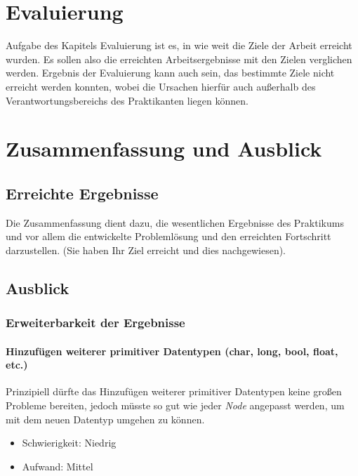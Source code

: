 \documentclass[oneside]{ausarbeitung}
\begin{document}
\chapter{Evaluierung}

Aufgabe des Kapitels Evaluierung ist es, in wie weit die Ziele der 
Arbeit erreicht wurden. Es sollen also die erreichten Arbeitsergebnisse 
mit den Zielen verglichen werden. Ergebnis der Evaluierung kann auch 
sein, das bestimmte Ziele nicht erreicht werden konnten, wobei die 
Ursachen hierfür auch außerhalb des Verantwortungsbereichs des 
Praktikanten liegen können.

\chapter{Zusammenfassung und Ausblick}
\label{cha:zusammenfassung}

\section{Erreichte Ergebnisse}
\label{sec:ergebnisse}

Die Zusammenfassung dient dazu, die wesentlichen Ergebnisse des 
Praktikums und vor allem die entwickelte Problemlösung und den 
erreichten Fortschritt darzustellen. (Sie haben Ihr Ziel erreicht und 
dies nachgewiesen).

\section{Ausblick}
\label{sec:ausblick}

\subsection{Erweiterbarkeit der Ergebnisse}
\label{sub:erweiterbarkeit}

\subsubsection{Hinzufügen weiterer primitiver Datentypen (char, long, bool, float, etc.)}
Prinzipiell dürfte das Hinzufügen weiterer primitiver Datentypen keine großen Probleme bereiten, jedoch müsste so gut wie jeder \textit{Node} angepasst werden, um mit dem neuen Datentyp umgehen zu können.
\begin{itemize}
\item{Schwierigkeit: Niedrig}
\item{Aufwand: Mittel}
\end{itemize}
\end{document}
